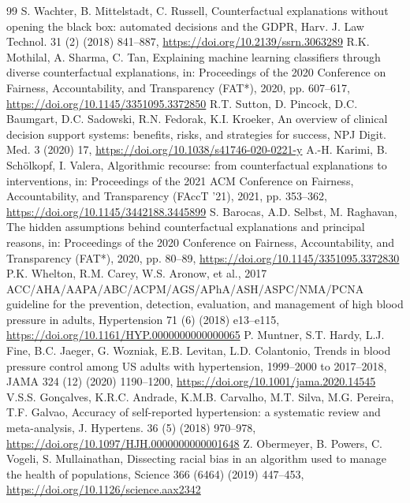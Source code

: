 \documentclass[preprint,review,12pt,times]{elsarticle}
\begin{document}
\begin{thebibliography}{99}
 S. Wachter, B. Mittelstadt, C. Russell, Counterfactual explanations without opening the black box: automated decisions and the GDPR, Harv. J. Law Technol. 31 (2) (2018) 841–887, \url{https://doi.org/10.2139/ssrn.3063289}
 R.K. Mothilal, A. Sharma, C. Tan, Explaining machine learning classifiers through diverse counterfactual explanations, in: Proceedings of the 2020 Conference on Fairness, Accountability, and Transparency (FAT*), 2020, pp. 607–617, \url{https://doi.org/10.1145/3351095.3372850}
 R.T. Sutton, D. Pincock, D.C. Baumgart, D.C. Sadowski, R.N. Fedorak, K.I. Kroeker, An overview of clinical decision support systems: benefits, risks, and strategies for success, NPJ Digit. Med. 3 (2020) 17, \url{https://doi.org/10.1038/s41746-020-0221-y}
 A.-H. Karimi, B. Schölkopf, I. Valera, Algorithmic recourse: from counterfactual explanations to interventions, in: Proceedings of the 2021 ACM Conference on Fairness, Accountability, and Transparency (FAccT '21), 2021, pp. 353–362, \url{https://doi.org/10.1145/3442188.3445899}
 S. Barocas, A.D. Selbst, M. Raghavan, The hidden assumptions behind counterfactual explanations and principal reasons, in: Proceedings of the 2020 Conference on Fairness, Accountability, and Transparency (FAT*), 2020, pp. 80–89, \url{https://doi.org/10.1145/3351095.3372830}
 P.K. Whelton, R.M. Carey, W.S. Aronow, et al., 2017 ACC/\allowbreak{}AHA/\allowbreak{}AAPA/\allowbreak{}ABC/\allowbreak{}ACPM/\allowbreak{}AGS/\allowbreak{}APhA/\allowbreak{}ASH/\allowbreak{}ASPC/\allowbreak{}NMA/\allowbreak{}PCNA guideline for the prevention, detection, evaluation, and management of high blood pressure in adults, Hypertension 71 (6) (2018) e13–e115, \url{https://doi.org/10.1161/HYP.0000000000000065}
 P. Muntner, S.T. Hardy, L.J. Fine, B.C. Jaeger, G. Wozniak, E.B. Levitan, L.D. Colantonio, Trends in blood pressure control among US adults with hypertension, 1999–2000 to 2017–2018, JAMA 324 (12) (2020) 1190–1200, \url{https://doi.org/10.1001/jama.2020.14545}
 V.S.S. Gonçalves, K.R.C. Andrade, K.M.B. Carvalho, M.T. Silva, M.G. Pereira, T.F. Galvao, Accuracy of self-reported hypertension: a systematic review and meta-analysis, J. Hypertens. 36 (5) (2018) 970–978, \url{https://doi.org/10.1097/HJH.0000000000001648}
 Z. Obermeyer, B. Powers, C. Vogeli, S. Mullainathan, Dissecting racial bias in an algorithm used to manage the health of populations, Science 366 (6464) (2019) 447–453, \url{https://doi.org/10.1126/science.aax2342}

\end{thebibliography}
\end{document}
